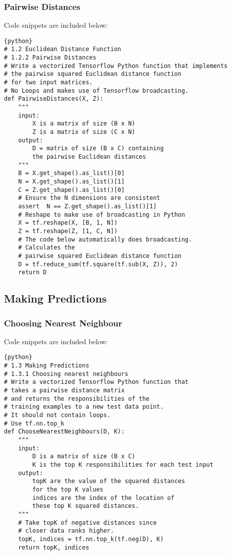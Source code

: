 \documentclass[a4paper,12pt]{article}
\begin{document}
\subsubsection{Pairwise Distances}
Code snippets are included below:
\begin{verbatim}
{python}
# 1.2 Euclidean Distance Function 
# 1.2.2 Pairwise Distances
# Write a vectorized Tensorflow Python function that implements
# the pairwise squared Euclidean distance function 
# for two input matrices.
# No Loops and makes use of Tensorflow broadcasting.
def PairwiseDistances(X, Z):
    """
    input:
        X is a matrix of size (B x N)
        Z is a matrix of size (C x N)
    output:
        D = matrix of size (B x C) containing 
        the pairwise Euclidean distances
    """
    B = X.get_shape().as_list()[0]
    N = X.get_shape().as_list()[1]
    C = Z.get_shape().as_list()[0]
    # Ensure the N dimensions are consistent 
    assert  N == Z.get_shape().as_list()[1]
    # Reshape to make use of broadcasting in Python
    X = tf.reshape(X, [B, 1, N])
    Z = tf.reshape(Z, [1, C, N])
    # The code below automatically does broadcasting.
    # Calculates the 
    # pairwise squared Euclidean distance function 
    D = tf.reduce_sum(tf.square(tf.sub(X, Z)), 2)
    return D
\end{verbatim}

\subsection{Making Predictions}
\subsubsection{Choosing Nearest Neighbour}
Code snippets are included below:
\begin{verbatim}
{python}
# 1.3 Making Predictions
# 1.3.1 Choosing nearest neighbours
# Write a vectorized Tensorflow Python function that 
# takes a pairwise distance matrix
# and returns the responsibilities of the 
# training examples to a new test data point. 
# It should not contain loops.
# Use tf.nn.top_k
def ChooseNearestNeighbours(D, K):
    """
    input:
        D is a matrix of size (B x C)
        K is the top K responsibilities for each test input
    output:
        topK are the value of the squared distances
        for the top K values
        indices are the index of the location of 
        these top K squared distances. 
    """
    # Take topK of negative distances since 
    # closer data ranks higher. 
    topK, indices = tf.nn.top_k(tf.neg(D), K)
    return topK, indices
\end{verbatim}
\end{document}
